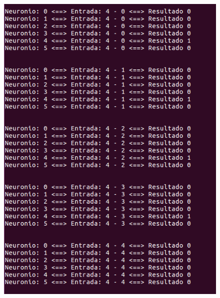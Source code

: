 \documentclass[hidelinks,12pt]{article}
\begin{document}
		\begin{figure}[!h]
			\centering
			\includegraphics[scale=0.5]{Figures/E3S4P1R.png}
		\end{figure}
		
\end{document}
